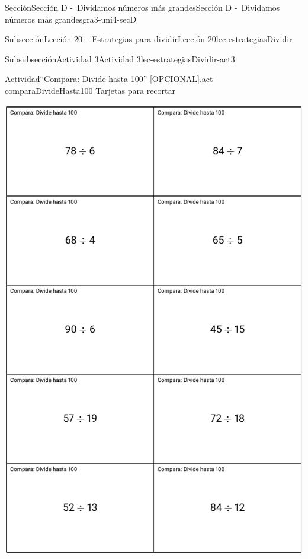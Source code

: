 \begin{sectionptx}{Sección}{Sección D -~Dividamos números más grandes}{}{Sección D -~Dividamos números más grandes}{}{}{gra3-uni4-secD}
\begin{subsectionptx}{Subsección}{Lección 20 -~Estrategias para dividir}{}{Lección 20}{}{}{lec-estrategiasDividir}
\begin{cutoutpage}
\begin{subsubsectionptx}{Subsubsección}{Actividad 3}{}{Actividad 3}{}{}{lec-estrategiasDividir-act3}
\begin{activity}{Actividad}{“Compara: Divide hasta 100” [OPCIONAL].}{act-comparaDivideHasta100}%
Tarjetas para recortar%
\end{activity}%
\includegraphics[max width=0.9\linewidth, center]{external/blm/tikz-source/act-comparaDivideHasta100-tarjetas-grandes1.pdf}
\cleardoublepage

\end{subsubsectionptx}
\end{cutoutpage}
\end{subsectionptx}
\end{sectionptx}
